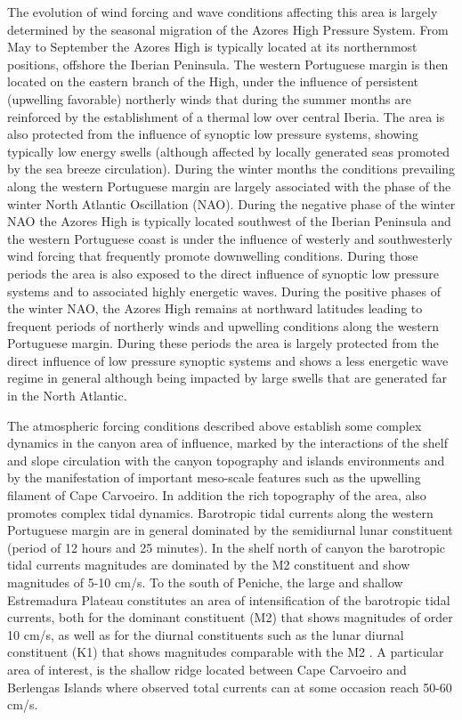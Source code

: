 The evolution of wind forcing and wave conditions affecting this area
is largely determined by the seasonal migration of the Azores High
Pressure System. From May to September the Azores High is typically
located at its northernmost positions, offshore the Iberian
Peninsula. The western Portuguese margin is then located on the
eastern branch of the High, under the influence of persistent
(upwelling favorable) northerly winds that during the summer months
are reinforced by the establishment of a thermal low over central
Iberia. The area is also protected from the influence of synoptic low
pressure systems, showing typically low energy swells (although
affected by locally generated seas promoted by the sea breeze
circulation). During the winter months the conditions prevailing along
the western Portuguese margin are largely associated with the phase of
the winter North Atlantic Oscillation (NAO). During the negative phase
of the winter NAO the Azores High is typically located southwest of
the Iberian Peninsula and the western Portuguese coast is under the
influence of westerly and southwesterly wind forcing that frequently
promote downwelling conditions. During those periods the area is also
exposed to the direct influence of synoptic low pressure systems and
to associated highly energetic waves. During the positive phases of
the winter NAO, the Azores High remains at northward latitudes leading
to frequent periods of northerly winds and upwelling conditions along
the western Portuguese margin. During these periods the area is
largely protected from the direct influence of low pressure synoptic
systems and shows a less energetic wave regime in general although
being impacted by large swells that are generated far in the North
Atlantic.

The atmospheric forcing conditions described above establish some
complex dynamics in the \naz canyon area of influence, marked by the
interactions of the shelf and slope circulation with the canyon
topography and islands environments and by the manifestation of
important meso-scale features such as the upwelling filament of Cape
Carvoeiro. In addition the rich topography of the area, also promotes
complex tidal dynamics. Barotropic tidal currents along the western
Portuguese margin are in general dominated by the semidiurnal lunar
constituent (period of 12 hours and 25 minutes).  In the shelf north
of \naz canyon the barotropic tidal currents magnitudes are dominated
by the M2 constituent and show magnitudes of 5-10 cm/s. To the south
of Peniche, the large and shallow Estremadura Plateau constitutes an
area of intensification of the barotropic tidal currents, both for the
dominant constituent (M2) that shows magnitudes of order 10 cm/s, as
well as for the diurnal constituents such as the lunar diurnal
constituent (K1) that shows magnitudes comparable with the M2
\cite{marta06,quaresma13}. A particular area of interest, is the
shallow ridge located between Cape Carvoeiro and Berlengas Islands
where observed total currents can at some occasion reach 50-60 cm/s.


